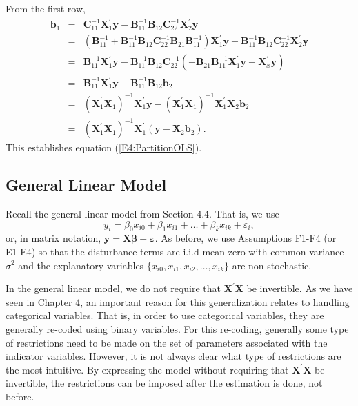 From the first row,
\begin{eqnarray*}
\mathbf{b}_1 &=& \mathbf{C}_{11}^{-1}
\mathbf{X}_1^{\prime}\mathbf{y} -
\mathbf{B}_{11}^{-1}\mathbf{B}_{12}\mathbf{C}_{22}^{-1}
\mathbf{X}_2^{\prime}\mathbf{y} \\
&=& \left( \mathbf{B}_{11}^{-1} + \mathbf{B}_{11}^{-1}
\mathbf{B}_{12} \mathbf{C}_{22}^{-1} \mathbf{B}_{21}
\mathbf{B}_{11}^{-1} \right) \mathbf{X}_1^{\prime}\mathbf{y} -
\mathbf{B}_{11}^{-1}\mathbf{B}_{12}\mathbf{C}_{22}^{-1}
\mathbf{X}_2^{\prime}\mathbf{y} \\
&=& \mathbf{B}_{11}^{-1}\mathbf{X}_1^{\prime}\mathbf{y} -
\mathbf{B}_{11}^{-1} \mathbf{B}_{12} \mathbf{C}_{22}^{-1} \left(
-\mathbf{B}_{21} \mathbf{B}_{11}^{-1} \mathbf{X}_1^{\prime}\mathbf{y} +
\mathbf{X}_x^{\prime}\mathbf{y}
\right) \\
&=& \mathbf{B}_{11}^{-1}\mathbf{X}_1^{\prime}\mathbf{y} -
\mathbf{B}_{11}^{-1} \mathbf{B}_{12} \mathbf{b}_2\\
&=& (\mathbf{X}_1^{\prime}\mathbf{X}_1)^{-1}\mathbf{X}_1^{\prime}\mathbf{y} -
(\mathbf{X}_1^{\prime}\mathbf{X}_1)^{-1} \mathbf{X}_1^{\prime}\mathbf{X}_2 \mathbf{b}_2\\
&=& (\mathbf{X}_1^{\prime}\mathbf{X}_1)^{-1}\mathbf{X}_1^{\prime}
\left(
\mathbf{y} - \mathbf{X}_2 \mathbf{b}_2
\right) .
\end{eqnarray*}
This establishes equation (\ref{E4:PartitionOLS}).


\subsection{General Linear Model}\label{S4:GeneralLinearModel}

Recall the general linear model from Section 4.4. That is, we use
\begin{equation*}
y_i = \beta_0 x_{i0} + \beta_1 x_{i1} + \ldots + \beta _k x_{ik} +
\varepsilon_i,
\end{equation*}
\noindent or, in matrix notation, $ \mathbf{y=X \boldsymbol \beta +
\boldsymbol \varepsilon.}$ As before, we use Assumptions F1-F4 (or E1-E4) so that
the disturbance terms are i.i.d mean zero with common variance $\sigma^2$ and the explanatory variables
$\{x_{i0},x_{i1},x_{i2},\ldots,x_{ik}\}$ are non-stochastic.

In the general linear model, we do not require that
$\mathbf{X}^{\prime}\mathbf{X}$ be invertible. As we have seen in
Chapter 4, an important reason for this generalization relates to
handling categorical variables. That is, in order to use categorical
variables, they are generally re-coded using binary variables. For
this re-coding, generally some type of restrictions need to be made
on the set of parameters associated with the indicator variables.
However, it is not always clear what type of restrictions are the
most intuitive. By expressing the model without requiring that $\mathbf{X}%
^{\prime}\mathbf{X}$ be invertible, the restrictions can be imposed
after the estimation is done, not before.

